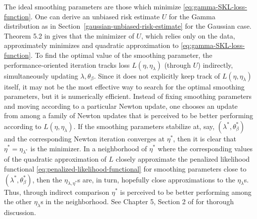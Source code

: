 The ideal smoothing parameters are those which minimize \eqref{eq:gamma-SKL-loss-function}. One can derive an unbiased risk estimate $U$ for the Gamma distribution as in Section~\ref{gaussian-unbiased-risk-estimate} for the Gaussian case. Theorem 5.2 in \cite{gu2013smoothing} gives that the minimizer of $U$, which relies only on the data, approximately minimizes and quadratic approximation to \eqref{eq:gamma-SKL-loss-function}. To find the optimal value of the smoothing parameter, the performance-oriented iteration tracks loss $L\left( \eta,\eta_\lambda \right)$ (through $U$) indirectly, simultaneously updating $\lambda, \theta_\beta$. Since it does not explicitly keep track of $L\left( \eta,\eta_\lambda \right)$ itself, it may not be the most effective way to search for the optimal smoothing parameters, but it is numerically efficient. Instead of fixing smoothing parameters and moving according to a particular Newton update, one chooses an update from among a family of Newton updates that is perceived to be better performing according to $L\left( \eta,\eta_\lambda \right)$. If the smoothing parameters stabilize at, say, $\left(\lambda^*,\theta^*_\beta\right)$ and the corresponding Newton iteration converges at $\eta^*$, then it is clear that $\eta^* = \eta_{\lambda^*}$ is the minimizer. In a neighborhood of $\eta^*$ where the corresponding values of the quadratic approximation of $L$ closely approximate the penalized likelihood functional \eqref{eq:penalized-likelihood-functional} for smoothing parameters close to $\left( \lambda^*, \theta^*_\beta \right)$, then the $\eta_{\lambda, \eta^*}$s are, in turn, hopefully close approximations to the $\eta_\lambda$s. Thus, through indirect comparison $\eta^*$ is perceived to be better performing among the other $\eta_\lambda$s in the neighborhood. See Chapter 5, Section 2 of \cite{gu2013smoothing} for thorough discussion.



